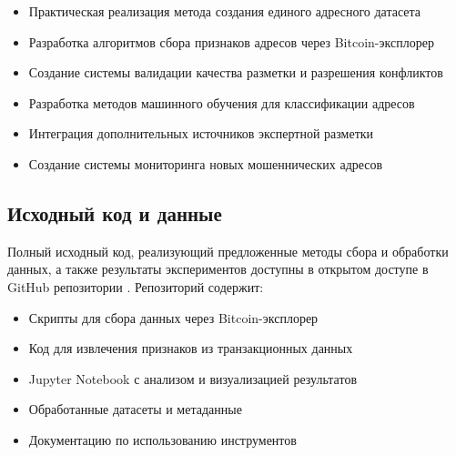 \begin{itemize}
    \item Практическая реализация метода создания единого адресного датасета
    \item Разработка алгоритмов сбора признаков адресов через Bitcoin-эксплорер
    \item Создание системы валидации качества разметки и разрешения конфликтов
    \item Разработка методов машинного обучения для классификации адресов
    \item Интеграция дополнительных источников экспертной разметки
    \item Создание системы мониторинга новых мошеннических адресов
\end{itemize}

\subsection{Исходный код и данные}

Полный исходный код, реализующий предложенные методы сбора и обработки данных, а также результаты экспериментов доступны в открытом доступе в GitHub репозитории \cite{github_repo}. Репозиторий содержит:

\begin{itemize}
    \item Скрипты для сбора данных через Bitcoin-эксплорер
    \item Код для извлечения признаков из транзакционных данных
    \item Jupyter Notebook с анализом и визуализацией результатов
    \item Обработанные датасеты и метаданные
    \item Документацию по использованию инструментов
\end{itemize}
